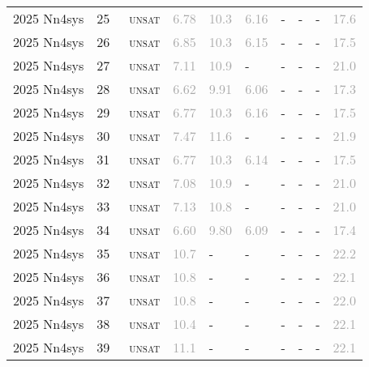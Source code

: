 \begin{center}
{\begin{longtable}{@{}llllllllll@{}}
2025 Nn4sys & 25 & ~\textsc{unsat} & \textcolor{darkgray}{6.78} & \textcolor{darkgray}{10.3} & \textcolor{darkgray}{6.16} & - & - & - & \textcolor{darkgray}{17.6} \\
2025 Nn4sys & 26 & ~\textsc{unsat} & \textcolor{darkgray}{6.85} & \textcolor{darkgray}{10.3} & \textcolor{darkgray}{6.15} & - & - & - & \textcolor{darkgray}{17.5} \\
2025 Nn4sys & 27 & ~\textsc{unsat} & \textcolor{darkgray}{7.11} & \textcolor{darkgray}{10.9} & - & - & - & - & \textcolor{darkgray}{21.0} \\
2025 Nn4sys & 28 & ~\textsc{unsat} & \textcolor{darkgray}{6.62} & \textcolor{darkgray}{9.91} & \textcolor{darkgray}{6.06} & - & - & - & \textcolor{darkgray}{17.3} \\
2025 Nn4sys & 29 & ~\textsc{unsat} & \textcolor{darkgray}{6.77} & \textcolor{darkgray}{10.3} & \textcolor{darkgray}{6.16} & - & - & - & \textcolor{darkgray}{17.5} \\
2025 Nn4sys & 30 & ~\textsc{unsat} & \textcolor{darkgray}{7.47} & \textcolor{darkgray}{11.6} & - & - & - & - & \textcolor{darkgray}{21.9} \\
2025 Nn4sys & 31 & ~\textsc{unsat} & \textcolor{darkgray}{6.77} & \textcolor{darkgray}{10.3} & \textcolor{darkgray}{6.14} & - & - & - & \textcolor{darkgray}{17.5} \\
2025 Nn4sys & 32 & ~\textsc{unsat} & \textcolor{darkgray}{7.08} & \textcolor{darkgray}{10.9} & - & - & - & - & \textcolor{darkgray}{21.0} \\
2025 Nn4sys & 33 & ~\textsc{unsat} & \textcolor{darkgray}{7.13} & \textcolor{darkgray}{10.8} & - & - & - & - & \textcolor{darkgray}{21.0} \\
2025 Nn4sys & 34 & ~\textsc{unsat} & \textcolor{darkgray}{6.60} & \textcolor{darkgray}{9.80} & \textcolor{darkgray}{6.09} & - & - & - & \textcolor{darkgray}{17.4} \\
2025 Nn4sys & 35 & ~\textsc{unsat} & \textcolor{darkgray}{10.7} & - & - & - & - & - & \textcolor{darkgray}{22.2} \\
2025 Nn4sys & 36 & ~\textsc{unsat} & \textcolor{darkgray}{10.8} & - & - & - & - & - & \textcolor{darkgray}{22.1} \\
2025 Nn4sys & 37 & ~\textsc{unsat} & \textcolor{darkgray}{10.8} & - & - & - & - & - & \textcolor{darkgray}{22.0} \\
2025 Nn4sys & 38 & ~\textsc{unsat} & \textcolor{darkgray}{10.4} & - & - & - & - & - & \textcolor{darkgray}{22.1} \\
2025 Nn4sys & 39 & ~\textsc{unsat} & \textcolor{darkgray}{11.1} & - & - & - & - & - & \textcolor{darkgray}{22.1} \\

\end{longtable}}
\end{center}
